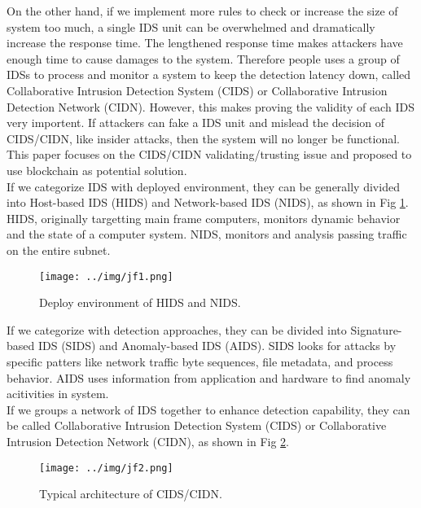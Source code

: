 \documentclass[12pt]{report}
\begin{document}
On the other hand, if we implement more rules to check or increase the size of system too much, a single IDS unit can be overwhelmed and dramatically increase the response time. The lengthened response time makes attackers have enough time to cause damages to the system. Therefore people uses a group of IDSs to process and monitor a system to keep the detection latency down, called Collaborative Intrusion Detection System (CIDS) or Collaborative Intrusion Detection Network (CIDN). However, this makes proving the validity of each IDS very importent. If attackers can fake a IDS unit and mislead the decision of CIDS/CIDN, like insider attacks, then the system will no longer be functional. This paper focuses on the CIDS/CIDN validating/trusting issue and proposed to use blockchain as potential solution. \\

If we categorize IDS with deployed environment, they can be generally divided into Host-based IDS (HIDS) and Network-based IDS (NIDS), as shown in Fig \ref{fig:jf1}. \cite{McAfee_next_gen_IDS}\cite{wiki_IDS}\cite{wiki_HIDS} HIDS, originally targetting main frame computers, monitors dynamic behavior and the state of a computer system. NIDS, monitors and analysis passing traffic on the entire subnet. \\

\begin{figure}[H]
	\centering
	\texttt{[image: ../img/jf1.png]}
	\caption{Deploy environment of HIDS and NIDS.}
	\label{fig:jf1}
\end{figure}

If we categorize with detection approaches, they can be divided into Signature-based IDS (SIDS) and Anomaly-based IDS (AIDS). \cite{wiki_IDS} SIDS looks for attacks by specific patters like network traffic byte sequences, file metadata, and process behavior. AIDS uses information from application and hardware to find anomaly acitivities in system. \\

If we groups a network of IDS together to enhance detection capability, they can be called Collaborative Intrusion Detection System (CIDS) or Collaborative Intrusion Detection Network (CIDN), as shown in Fig \ref{fig:jf2}.

\begin{figure}[H]
	\centering
	\texttt{[image: ../img/jf2.png]}
	\caption{Typical architecture of CIDS/CIDN.}
	\label{fig:jf2}
\end{figure}
\end{document}
